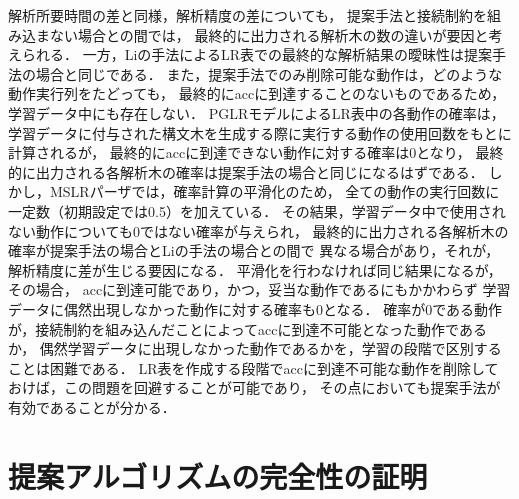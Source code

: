 \documentclass[japanese]{jnlp_1.4}
\begin{document}
解析所要時間の差と同様，解析精度の差についても，
提案手法と接続制約を組み込まない場合との間では，
最終的に出力される解析木の数の違いが要因と考えられる．
一方，Liの手法によるLR表での最終的な解析結果の曖昧性は提案手法の場合と同じである．
また，提案手法でのみ削除可能な動作は，どのような動作実行列をたどっても，
最終的にaccに到達することのないものであるため，学習データ中にも存在しない．
PGLRモデルによるLR表中の各動作の確率は，
学習データに付与された構文木を生成する際に実行する動作の使用回数をもとに計算されるが，
最終的にaccに到達できない動作に対する確率は0となり，
最終的に出力される各解析木の確率は提案手法の場合と同じになるはずである．
しかし，MSLRパーザでは，確率計算の平滑化のため，
全ての動作の実行回数に一定数（初期設定では0.5）を加えている．
その結果，学習データ中で使用されない動作についても0ではない確率が与えられ，
最終的に出力される各解析木の確率が提案手法の場合とLiの手法の場合との間で
異なる場合があり，それが，解析精度に差が生じる要因になる．
平滑化を行わなければ同じ結果になるが，その場合，
accに到達可能であり，かつ，妥当な動作であるにもかかわらず
学習データに偶然出現しなかった動作に対する確率も0となる．
確率が0である動作が，接続制約を組み込んだことによってaccに到達不可能となった動作であるか，
偶然学習データに出現しなかった動作であるかを，学習の段階で区別することは困難である．
LR表を作成する段階でaccに到達不可能な動作を削除しておけば，この問題を回避することが可能であり，
その点においても提案手法が有効であることが分かる．


\section{提案アルゴリズムの完全性の証明}
\label{sec:completeness}
\end{document}
